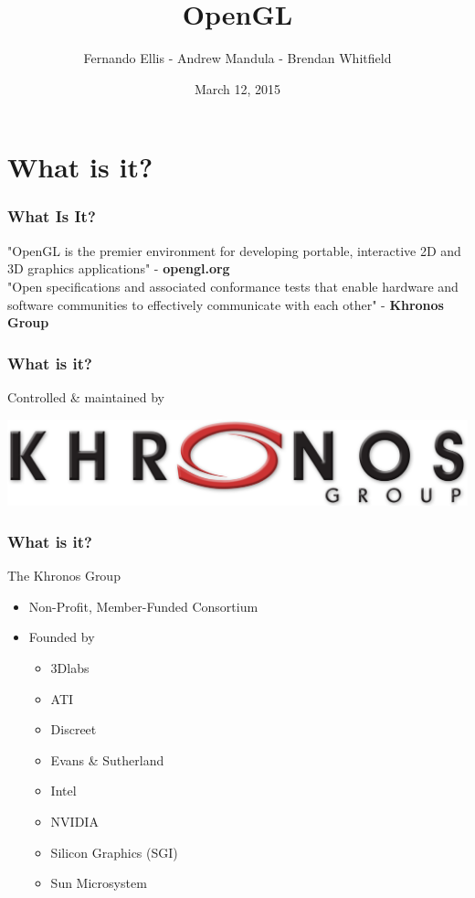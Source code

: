 \documentclass[10pt, compress]{beamer}
\title{OpenGL}
\subtitle{}
\date{March 12, 2015}
\author{Fernando Ellis  -  Andrew Mandula  -  Brendan Whitfield}
\institute{Business and Legal Aspects of FOSS - Enterprise Company Profile}
\begin{document}
\maketitle

\section{What is it?}

\begin{frame}[fragile]
  \frametitle{What Is It?}

  "OpenGL is the premier environment for developing portable, interactive 2D and 3D graphics applications" - \textbf{opengl.org}  \\ \vspace{3mm}
  "Open specifications and associated conformance tests that enable hardware and software communities to effectively communicate with each other" - \textbf{Khronos Group}
\end{frame}

\begin{frame}[fragile]
    \frametitle{What is it?}
    
    
    \begin{center} Controlled & maintained by \end{center} 
    
    \includegraphics[width=\textwidth]{images/khronos.png}
\end{frame}

\begin{frame}[fragile]
    \frametitle{What is it?}
    
    The Khronos Group
    \begin{itemize}
        \item Non-Profit, Member-Funded Consortium
        \item Founded by
        \begin{itemize}
            \item 3Dlabs 
            \item ATI
            \item Discreet
            \item Evans & Sutherland
            \item Intel
            \item NVIDIA
            \item Silicon Graphics (SGI)
            \item Sun Microsystem
        \end{itemize}
    \end{itemize}

\end{frame}
\end{document}
